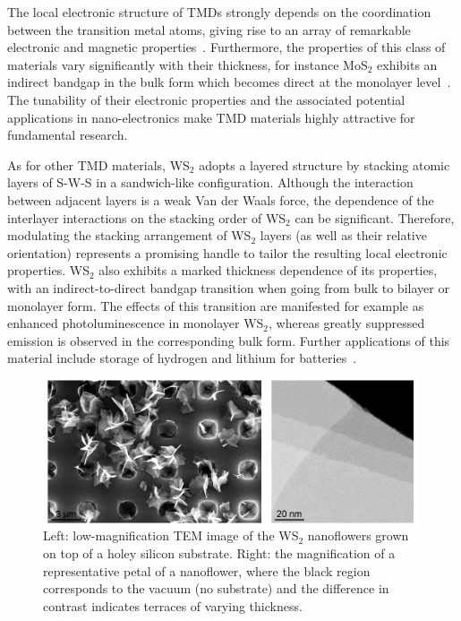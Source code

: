 The local electronic structure of TMDs strongly depends on the coordination 
between the transition metal atoms, giving rise to an array of remarkable electronic
and magnetic properties~\cite{Chhowalla:2013}.
%
Furthermore, the properties of this class of materials vary significantly
with their thickness, for instance MoS$_2$ exhibits an indirect bandgap
in the bulk form which becomes direct at the monolayer level~\cite{Splendiani:2010}.
%
The tunability of their electronic properties and the associated
potential applications in nano-electronics make TMD materials highly attractive for fundamental research. 

As for other TMD materials, WS$_2$ adopts a layered structure 
by stacking atomic layers of S-W-S in a sandwich-like configuration. 
%
Although the interaction between adjacent layers is a weak Van der Waals 
force, the dependence of the interlayer interactions on the stacking 
order of WS$_2$ can be significant.
%
Therefore, modulating the stacking arrangement of WS$_2$ layers (as well
as their relative orientation)
represents a promising handle to tailor the resulting local electronic properties.
%
WS$_2$ also exhibits a marked thickness dependence of
its properties, with an indirect-to-direct bandgap transition when going
from bulk to bilayer or monolayer form.
%
The effects of this transition are manifested for example as enhanced
photoluminescence in monolayer WS$_2$, whereas greatly suppressed emission is observed in
the corresponding bulk form.
%
Further applications of this material include storage of hydrogen 
and lithium for batteries~\cite{Bhandavat:2012}.

\begin{figure}[t]
    \centering
    \includegraphics[width=0.99\textwidth]{plots/TEMwE-full-figure-withscales-centred-1.pdf}
    \caption{Left: low-magnification TEM image of the WS$_2$ nanoflowers
      grown on top of a holey silicon substrate.
      Right: the magnification of a
      representative petal
      of a nanoflower, where the black region corresponds to the vacuum (no substrate)
      and the difference in contrast indicates terraces of varying thickness.
       }
    \label{fig:nanoflowers}
\end{figure}

